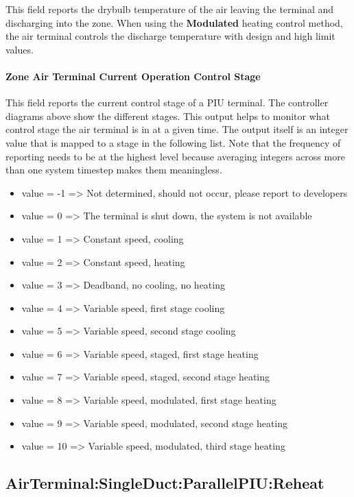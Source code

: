 This field reports the drybulb temperature of the air leaving the terminal and discharging into the zone. When using the \textbf{Modulated} heating control method, the air terminal controls the discharge temperature with design and high limit values.

\paragraph{Zone Air Terminal Current Operation Control Stage}

This field reports the current control stage of a PIU terminal. The controller diagrams above show the different stages. This output helps to monitor what control stage the air terminal is in at a given time. The output itself is an integer value that is mapped to a stage in the following list. Note that the frequency of reporting needs to be at the highest level because averaging integers across more than one system timestep makes them meaningless.

\begin{itemize}
\item
  value = -1  => Not determined, should not occur, please report to developers
\item
  value = 0 => The terminal is shut down, the system is not available
\item
  value = 1 => Constant speed, cooling
\item
  value = 2 => Constant speed, heating
\item
  value = 3 => Deadband, no cooling, no heating
\item
  value = 4 => Variable speed, first stage cooling
\item
  value = 5 => Variable speed, second stage cooling
\item
  value = 6 => Variable speed, staged, first stage heating
\item
  value = 7 => Variable speed, staged, second stage heating
\item
  value = 8 => Variable speed, modulated, first stage heating
\item
  value = 9 => Variable speed, modulated, second stage heating
\item
  value = 10 => Variable speed, modulated, third stage heating
\end{itemize}

\subsection{AirTerminal:SingleDuct:ParallelPIU:Reheat}\label{airterminalsingleductparallelpiureheat}

